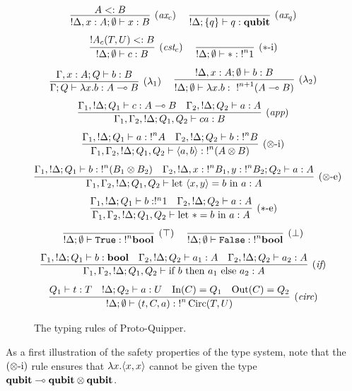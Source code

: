 \documentclass[twoside]{article}
\begin{document}
\begin{figure}[!ht]
\begin{mdframed}
\[
\infer[(\rul{ax}_c)]{{!}\Delta, x:A;\emptyset\entails x:B}{
  A<:B
}
~~~~
\infer[(\rul{ax}_q)]{{!}\Delta;\s{q}\entails q:\qubit}{
} 
\]
\[
\infer[(\rul{cst}_c)]{{!}\Delta;\emptyset \entails c:B}{
  {!}A_{c}(T,U)<:B
} 
~~~~
\infer[(*\mbox{-i})]{{!}\Delta;\emptyset\entails *:{!}^n 1}{
}
\]
\[
\infer[(\lambda_1)]{\Gamma;Q\entails \lambda x.b:A\loli B}{
  \Gamma,x:A;Q \entails b:B
}
~~~~
\infer[(\lambda_2)]{{!}\Delta;\emptyset \entails \lambda x.b:~{!}^{n+1}(A\loli B)}{
  {!}\Delta, x:A;\emptyset \entails b:B
}
\]
\[
\infer[(\rul{app})]{\Gamma_1,\Gamma_2, {!}\Delta;Q_1,Q_2\entails ca:B}{
  \Gamma_1, {!}\Delta;Q_1\entails c:A\loli B 
  &
  \Gamma_2, {!}\Delta ;Q_2\entails a:A 
}
\]
\[
\infer[(\x\mbox{-i})]{\Gamma_1,\Gamma_2, {!}\Delta;Q_1,Q_2\entails \p{a,b}:{!}^n(A\x B)}{
  \Gamma_1, {!}\Delta;Q_1\entails a:{!}^nA 
  &
  \Gamma_2, {!}\Delta ;Q_2\entails b:{!}^nB
}
\]
\[
\infer[(\x\mbox{-e})]{\Gamma_1,\Gamma_2, {!}\Delta;Q_1,Q_2\entails \letin{\p{x,y}}{b}{a}:A}{
  \Gamma_1, {!}\Delta;Q_1\entails b:{!}^n(B_1\x B_2) 
  &
  \Gamma_2, {!}\Delta, x:{!}^nB_1, y:{!}^nB_2 ;Q_2\entails a:A
}
\]
\[
\infer[(*\mbox{-e})]{\Gamma_1,\Gamma_2, {!}\Delta;Q_1,Q_2\entails \letin{*}{b}{a}:A}{
  \Gamma_1, {!}\Delta;Q_1\entails b:!^n1
  &
  \Gamma_2, {!}\Delta ;Q_2\entails a:A
}
\]
\[
\infer[(\top)]{{!}\Delta;\emptyset\entails \true:{!}^n \bool}{
} 
~~~~
\infer[(\bot)]{{!}\Delta;\emptyset\entails \false:{!}^n \bool}{
}
\]
\[
\infer[(\rul{if})]{\Gamma_1,\Gamma_2, {!}\Delta;Q_1,Q_2\entails \ifthenelse{b}{a_1}{a_2}:A}{
  \Gamma_1, {!}\Delta;Q_1\entails b:\bool 
  &
  \Gamma_2, {!}\Delta;Q_2 \entails a_1:A ~~~ \Gamma_2, {!}\Delta;Q_2 \entails a_2:A
}
\]
\[
\infer[(\rul{circ})]{{!}\Delta;\emptyset \entails (t,C,a):{!}^n\Circ(T,U)}{
  Q_1\entails t:T 
  &
  {!}\Delta ; Q_2\entails a:U 
  &
  \In(C)=Q_1 
  &
  \Out(C)=Q_2
}
\]
\end{mdframed}
\caption{The typing rules of Proto-Quipper.}
\label{trules}
\end{figure}

As a first illustration of the safety properties of the type system,
note that the $(\otimes\mbox{-i})$ rule ensures that $\lambda x. \langle x,x\rangle$
cannot be given the type $\textrm{\bf qubit}\multimap \textrm{\bf qubit} \otimes \textrm{\bf qubit}$.
\end{document}
